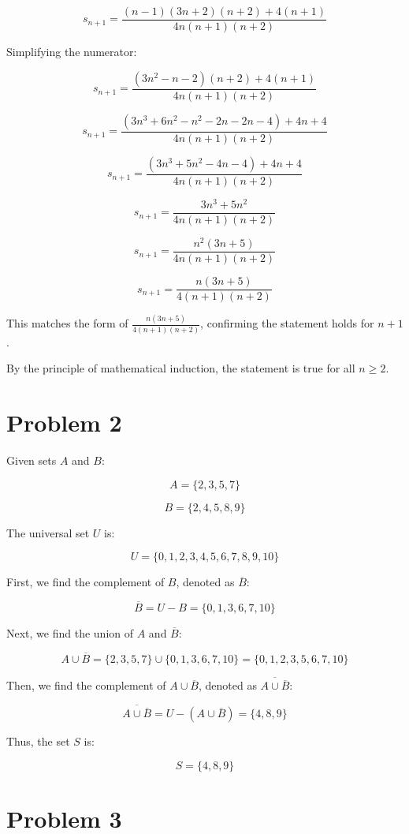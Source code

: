 \documentclass{article}
\begin{document}
\[
s_{n+1} = \frac{(n-1)(3n+2)(n+2) + 4(n+1)}{4n(n+1)(n+2)}
\]

Simplifying the numerator:

\[
s_{n+1} = \frac{(3n^2-n-2)(n+2)+4(n+1)}{4n(n+1)(n+2)}
\]

\[
s_{n+1} = \frac{(3n^3+6n^2-n^2-2n-2n-4)+4n+4}{4n(n+1)(n+2)}
\]

\[
s_{n+1} = \frac{(3n^3+5n^2-4n-4)+4n+4}{4n(n+1)(n+2)}
\]

\[
s_{n+1} = \frac{3n^3+5n^2}{4n(n+1)(n+2)}
\]

\[
s_{n+1} = \frac{n^2(3n+5)}{4n(n+1)(n+2)}
\]

\[
s_{n+1} = \frac{n(3n+5)}{4(n+1)(n+2)}
\]




This matches the form of \( \frac{n(3n+5)}{4(n+1)(n+2)} \), confirming the statement holds for \( n+1 \).

By the principle of mathematical induction, the statement is true for all \( n \geq 2 \).

\section*{Problem 2}

Given sets \( A \) and \( B \):

\[
A = \{2, 3, 5, 7\}
\]

\[
B = \{2, 4, 5, 8, 9\}
\]

The universal set \( U \) is:

\[
U = \{0, 1, 2, 3, 4, 5, 6, 7, 8, 9, 10\}
\]

First, we find the complement of \( B \), denoted as \( \overline{B} \):

\[
\overline{B} = U - B = \{0, 1, 3, 6, 7, 10\}
\]

Next, we find the union of \( A \) and \( \overline{B} \):

\[
A \cup \overline{B} = \{2, 3, 5, 7\} \cup \{0, 1, 3, 6, 7, 10\} = \{0, 1, 2, 3, 5, 6, 7, 10\}
\]

Then, we find the complement of \( A \cup \overline{B} \), denoted as \( \overline{A \cup \overline{B}} \):

\[
\overline{A \cup \overline{B}} = U - (A \cup \overline{B}) = \{4, 8, 9\}
\]

Thus, the set \( S \) is:

\[
S = \{4, 8, 9\}
\]

\section*{Problem 3}
\end{document}

